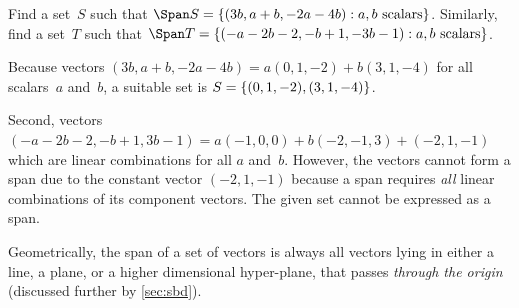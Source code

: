 \begin{example} 
Find a set~\(S\) such that \(\Span S=\{(3b,a+b,-2a-4b): a,b\text{ scalars}\}\).
Similarly, find a set~\(T\) such that \(\Span T=\{(-a-2b-2,-b+1, -3b-1): a,b\text{ scalars}\}\).
\begin{solution} 
Because vectors \((3b,a+b,-2a-4b)=a(0,1,-2)+b(3,1,-4)\) for all scalars~\(a\) and~\(b\),  a suitable set is \(S=\{(0,1,-2),\linebreak[1] (3,1,-4)\}\). 

Second, vectors \((-a-2b-2,-b+1, 3b-1)=a(-1,0,0)+b(-2,-1,3)+(-2,1,-1)\) which are linear combinations for all \(a\) and~\(b\). 
However, the vectors cannot form a span due to the constant vector \((-2,1,-1)\) because a span requires \emph{all} linear combinations of its component vectors.
The given set cannot be expressed as a span. 
\end{solution}
\end{example}





Geometrically, the span of a set of vectors is always all vectors lying in either a line, a plane, or  a higher dimensional hyper-plane, that passes \emph{through the origin} (discussed further by \cref{sec:sbd}).

%
%



\sectionExercises



